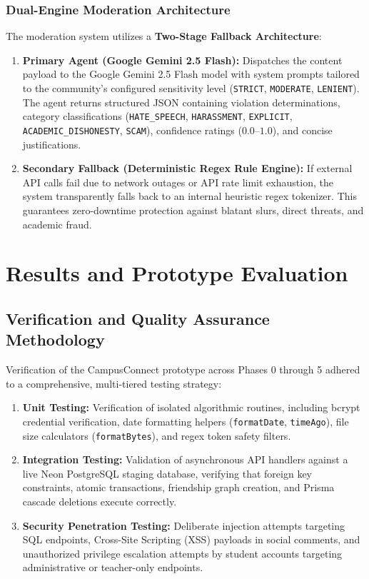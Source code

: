 \documentclass[12pt, a4paper, oneside]{report}
\begin{document}
\subsection{Dual-Engine Moderation Architecture}
The moderation system utilizes a \textbf{Two-Stage Fallback Architecture}:
\begin{enumerate}[leftmargin=0.7cm]
    \item \textbf{Primary Agent (Google Gemini 2.5 Flash):} Dispatches the content payload to the Google Gemini 2.5 Flash model with system prompts tailored to the community's configured sensitivity level (\texttt{STRICT}, \texttt{MODERATE}, \texttt{LENIENT}). The agent returns structured JSON containing violation determinations, category classifications (\texttt{HATE\_SPEECH}, \texttt{HARASSMENT}, \texttt{EXPLICIT}, \texttt{ACADEMIC\_DISHONESTY}, \texttt{SCAM}), confidence ratings ($0.0$--$1.0$), and concise justifications.
    \item \textbf{Secondary Fallback (Deterministic Regex Rule Engine):} If external API calls fail due to network outages or API rate limit exhaustion, the system transparently falls back to an internal heuristic regex tokenizer. This guarantees zero-downtime protection against blatant slurs, direct threats, and academic fraud.
\end{enumerate}

\chapter{Results and Prototype Evaluation}

\section{Verification and Quality Assurance Methodology}
Verification of the CampusConnect prototype across Phases 0 through 5 adhered to a comprehensive, multi-tiered testing strategy:
\begin{enumerate}[leftmargin=0.7cm]
    \item \textbf{Unit Testing:} Verification of isolated algorithmic routines, including bcrypt credential verification, date formatting helpers (\texttt{formatDate}, \texttt{timeAgo}), file size calculators (\texttt{formatBytes}), and regex token safety filters.
    \item \textbf{Integration Testing:} Validation of asynchronous API handlers against a live Neon PostgreSQL staging database, verifying that foreign key constraints, atomic transactions, friendship graph creation, and Prisma cascade deletions execute correctly.
    \item \textbf{Security Penetration Testing:} Deliberate injection attempts targeting SQL endpoints, Cross-Site Scripting (XSS) payloads in social comments, and unauthorized privilege escalation attempts by student accounts targeting administrative or teacher-only endpoints.
\end{enumerate}
\end{document}
